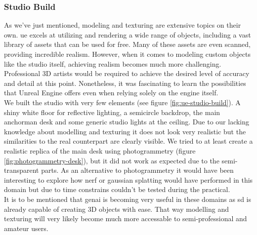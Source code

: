 \documentclass[
  a4paper,  %
  twoside,  %
  bibliography=totoc,
  headsepline,
  cleardoublepage=empty,
  parskip=half,
  draft=false
]{scrbook}
\begin{document}
\subsubsection*{Studio Build}
As we've just mentioned, modeling and texturing are extensive topics on their own. \gls{ue} excels at utilizing and rendering a wide range of objects, including a vast library of assets that can be used for free. Many of these assets are even scanned, providing incredible realism. However, when it comes to modeling custom objects like the studio itself, achieving realism becomes much more challenging. Professional 3D artists would be required to achieve the desired level of accuracy and detail at this point. Nonetheless, it was fascinating to learn the possibilities that Unreal Engine offers even when relying solely on the engine itself. \\
We built the studio with very few elements (see figure \ref{fig:ue-studio-build}). A shiny white floor for reflective lighting, a semicircle backdrop, the main anchorman desk and some generic studio lights at the ceiling. Due to our lacking knowledge about modelling and texturing it does not look very realistic but the similarities to the real counterpart are clearly visible. We tried to at least create a realistic replica of the main desk using photogrammetry (figure \ref{fig:photogrammetry-desk}), but it did not work as expected due to the semi-transparent parts. As an alternative to photogrammetry it would have been interesting to explore how \gls{nerf} or gaussian splatting would have performed in this domain but due to time constrains couldn't be tested during the practical. \\ 
It is to be mentioned that \gls{genai} is becoming very useful in these domains as \gls{sd} is already capable of creating 3D objects with ease. That way modelling and texturing will very likely become much more accessable to semi-professional and amateur users.
\end{document}
